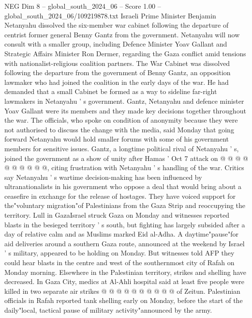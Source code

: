 \begin{textsample}{NEG Dim 8 – global\_south\_2024\_06 – Score 1.00 – global\_south\_2024\_06/109219878.txt}  \label{ex:f8_neg_248}
Israeli Prime Minister Benjamin Netanyahu dissolved the six-member war cabinet following the departure of centrist former general Benny Gantz from the government.
Netanyahu will now consult with a smaller group, including Defence Minister Yoav Gallant and Strategic Affairs Minister Ron Dermer, regarding the Gaza conflict amid tensions with nationalist-religious coalition partners.
The War Cabinet was dissolved following the departure from the government of Benny Gantz, an opposition lawmaker who had joined the coalition in the early days of the war.
He had demanded that a small Cabinet be formed as a way to sideline far-right lawmakers in Netanyahu ' s government.
Gantz, Netanyahu and defence minister Yoav Gallant were its members and they made key decisions together throughout the war.
The officials, who spoke on condition of anonymity because they were not authorised to discuss the change with the media, said Monday that going forward Netanyahu would hold smaller forums with some of his government members for sensitive issues.
Gantz, a longtime political rival of Netanyahu ' s, joined the government as a show of unity after Hamas ' Oct 7 attack on @ @ @ @ @ @ @ @ @ @, citing frustration with Netanyahu ' s handling of the war.
Critics say Netanyahu ' s wartime decision-making has been influenced by ultranationalists in his government who oppose a deal that would bring about a ceasefire in exchange for the release of hostages.
They have voiced support for the"voluntary migration"of Palestinians from the Gaza Strip and reoccupying the territory.
Lull in GazaIsrael struck Gaza on Monday and witnesses reported blasts in the besieged territory ' s south, but fighting has largely subsided after a day of relative calm and as Muslims marked Eid al-Adha.
A daytime"pause"for aid deliveries around a southern Gaza route, announced at the weekend by Israel ' s military, appeared to be holding on Monday.
But witnesses told AFP they could hear blasts in the centre and west of the southernmost city of Rafah on Monday morning.
Elsewhere in the Palestinian territory, strikes and shelling have decreased.
In Gaza City, medics at Al-Ahli hospital said at least five people were killed in two separate air strikes @ @ @ @ @ @ @ @ @ @ of Zeitun.
Palestinian officials in Rafah reported tank shelling early on Monday, before the start of the daily"local, tactical pause of military activity"announced by the army.

\end{textsample}

